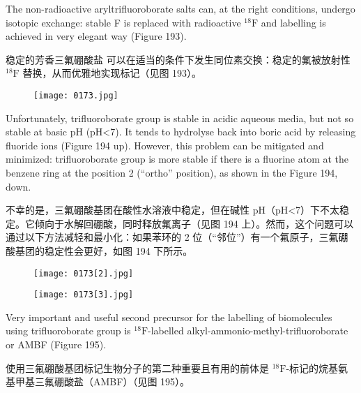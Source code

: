\documentclass[dvipsnames, svgnames,a4paper,11pt]{article}
\begin{document}
The non-radioactive aryltrifluoroborate salts \ce{[R-Ar-BF3]-} can, at the right conditions,
undergo isotopic exchange: stable F is replaced with radioactive ${}^\mathrm{18}\mathrm{F}$ and labelling is
achieved in very elegant way (Figure 193).

稳定的芳香三氟硼酸盐 \ce{[R-Ar-BF3]-} 可以在适当的条件下发生同位素交换：稳定的氟被放射性 ${}^\mathrm{18}\mathrm{F}$ 替换，从而优雅地实现标记（见图 193）。

\begin{figure}[h]
	\centering
    \texttt{[image: 0173.jpg]}   
     \label{fig193}
\end{figure}


Unfortunately, trifluoroborate group is stable in acidic aqueous media, but not so
stable at basic pH (pH<7). It tends to hydrolyse back into boric acid by releasing
fluoride ions (Figure 194 up). However, this problem can be mitigated and minimized:
trifluoroborate group is more stable if there is a fluorine atom at the benzene ring at
the position 2 (“ortho” position), as shown in the Figure 194, down.

不幸的是，三氟硼酸基团在酸性水溶液中稳定，但在碱性 pH（pH<7）下不太稳定。它倾向于水解回硼酸，同时释放氟离子（见图 194 上）。然而，这个问题可以通过以下方法减轻和最小化：如果苯环的 2 位（“邻位”）有一个氟原子，三氟硼酸基团的稳定性会更好，如图 194 下所示。

\begin{figure}[h]
	\centering
    \texttt{[image: 0173[2].jpg]}   
     \label{fig194}
\end{figure}

\begin{figure}[h]
	\centering
    \texttt{[image: 0173[3].jpg]}   
     \label{fig195}
\end{figure}
Very important and useful second precursor for the labelling of biomolecules using
trifluoroborate group is ${}^\mathrm{18}\mathrm{F}$-labelled alkyl-ammonio-methyl-trifluoroborate or AMBF
(Figure 195).


使用三氟硼酸基团标记生物分子的第二种重要且有用的前体是 ${}^\mathrm{18}\mathrm{F}$-标记的烷基氨基甲基三氟硼酸盐（AMBF）（见图 195）。
\end{document}
